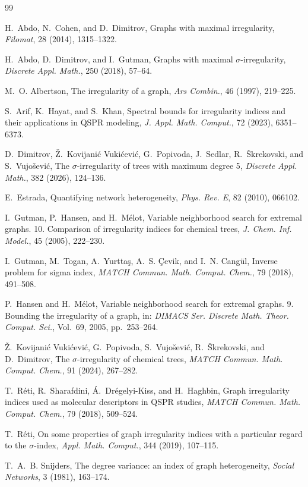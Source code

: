 \documentclass[preprint,12pt]{elsarticle}
\begin{document}
\begin{thebibliography}{99}

H.~Abdo, N.~Cohen, and D.~Dimitrov, 
Graphs with maximal irregularity, 
\emph{Filomat}, 28 (2014), 1315--1322.

H.~Abdo, D.~Dimitrov, and I.~Gutman, 
Graphs with maximal $\sigma$-irregularity, 
\emph{Discrete Appl. Math.}, 250 (2018), 57--64.

M.~O. Albertson, 
The irregularity of a graph, 
\emph{Ars Combin.}, 46 (1997), 219--225.

S.~Arif, K.~Hayat, and S.~Khan, Spectral bounds for irregularity indices and their applications in QSPR modeling, \emph{J. Appl. Math. Comput.}, 72 (2023), 6351–6373.



D.~Dimitrov, Ž.~Kovijanić Vukićević, G.~Popivoda, J.~Sedlar, R.~Škrekovski, and S.~Vujošević, 
The $\sigma$-irregularity of trees with maximum degree 5, 
\emph{Discrete Appl. Math.}, 382 (2026), 124--136.



E.~Estrada, 
Quantifying network heterogeneity, 
\emph{Phys. Rev. E}, 82 (2010), 066102.

I.~Gutman, P.~Hansen, and H.~Mélot, 
Variable neighborhood search for extremal graphs. 10. Comparison of irregularity indices for chemical trees, 
\emph{J. Chem. Inf. Model.}, 45 (2005), 222--230.

I.~Gutman, M.~Togan, A.~Yurttaş, A.~S. \c{C}evik, and I.~N. Cangül, 
Inverse problem for sigma index, 
\emph{MATCH Commun. Math. Comput. Chem.}, 79 (2018), 491--508.

P.~Hansen and H.~Mélot, 
Variable neighborhood search for extremal graphs. 9. Bounding the irregularity of a graph, 
in: \emph{DIMACS Ser. Discrete Math. Theor. Comput. Sci.}, Vol.~69, 2005, pp.~253--264.

Ž.~Kovijanić Vukićević, G.~Popivoda, S.~Vujošević, R.~Škrekovski, and D.~Dimitrov, 
The $\sigma$-irregularity of chemical trees, 
\emph{MATCH Commun. Math. Comput. Chem.}, 91 (2024), 267--282.

T.~Réti, R.~Sharafdini, Á.~Drégelyi-Kiss, and H.~Haghbin, 
Graph irregularity indices used as molecular descriptors in QSPR studies, 
\emph{MATCH Commun. Math. Comput. Chem.}, 79 (2018), 509--524.

T.~Réti, 
On some properties of graph irregularity indices with a particular regard to the $\sigma$-index, 
\emph{Appl. Math. Comput.}, 344 (2019), 107--115.

T.~A.~B. Snijders, 
The degree variance: an index of graph heterogeneity, 
\emph{Social Networks}, 3 (1981), 163--174.

\end{thebibliography}
\end{document}
